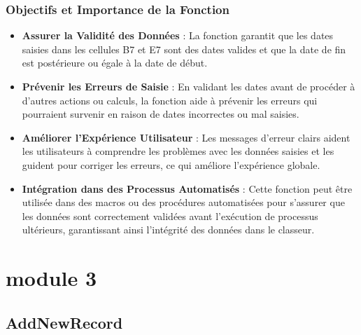 \documentclass[a4paper, oneside, 12pt, final]{extreport}
\begin{document}
\subsubsection{Objectifs et Importance de la Fonction}

\begin{itemize}
    \item \textbf{Assurer la Validité des Données} : La fonction garantit que les dates saisies dans les cellules B7 et E7 sont des dates valides et que la date de fin est postérieure ou égale à la date de début.
    \item \textbf{Prévenir les Erreurs de Saisie} : En validant les dates avant de procéder à d'autres actions ou calculs, la fonction aide à prévenir les erreurs qui pourraient survenir en raison de dates incorrectes ou mal saisies.
    \item \textbf{Améliorer l'Expérience Utilisateur} : Les messages d'erreur clairs aident les utilisateurs à comprendre les problèmes avec les données saisies et les guident pour corriger les erreurs, ce qui améliore l'expérience globale.
    \item \textbf{Intégration dans des Processus Automatisés} : Cette fonction peut être utilisée dans des macros ou des procédures automatisées pour s'assurer que les données sont correctement validées avant l'exécution de processus ultérieurs, garantissant ainsi l'intégrité des données dans le classeur.
\end{itemize}

\section{module 3}
\subsection{AddNewRecord}
\end{document}
